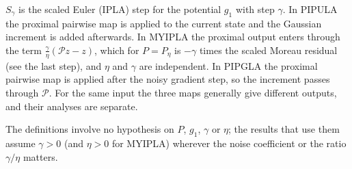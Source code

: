 \documentclass[11pt,a4paper]{article}
\begin{document}
\(S_\gamma\) is the scaled Euler (IPLA) step for the potential \(g_1\) with step \(\gamma\). In PIPULA the proximal pairwise map is applied to the current state and the Gaussian increment is added afterwards. In MYIPLA the proximal output enters through the term \(\frac\gamma\eta(\mathcal Pz-z)\), which for \(P=P_\eta\) is \(-\gamma\) times the scaled Moreau residual (see the last step), and \(\eta\) and \(\gamma\) are independent. In PIPGLA the proximal pairwise map is applied after the noisy gradient step, so the increment passes through \(\mathcal P\). For the same input the three maps generally give different outputs, and their analyses are separate.




The definitions involve no hypothesis on \(P\), \(g_1\), \(\gamma\) or \(\eta\); the results that use them assume \(\gamma>0\) (and \(\eta>0\) for MYIPLA) wherever the noise coefficient or the ratio \(\gamma/\eta\) matters.
\end{document}

